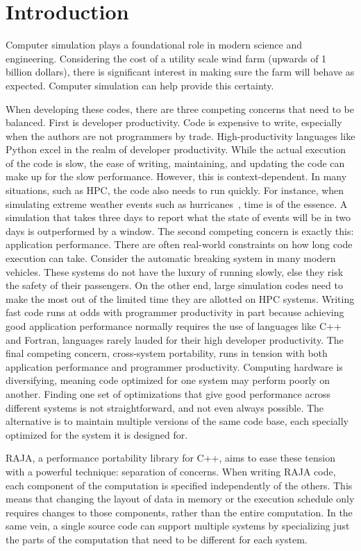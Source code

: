 \documentclass{article}
\begin{document}
\section{Introduction}

Computer simulation plays a foundational role in modern science and engineering. 
Considering the cost of a utility scale wind farm (upwards of 1 billion dollars), there is significant interest in making sure the farm will behave as expected.
Computer simulation can help provide this certainty.

When developing these codes, there are three competing concerns that need to be balanced.
First is developer productivity.
Code is expensive to write, especially when the authors are not programmers by trade.
High-productivity languages like Python excel in the realm of developer productivity.
While the actual execution of the code is slow, the ease of writing, maintaining, and updating the code can make up for the slow performance.
However, this is context-dependent. 
In many situations, such as HPC, the code also needs to run quickly.
For instance, when simulating extreme weather events such as hurricanes~\cite{fu2017redesigning}, time is of the essence. 
A simulation that takes three days to report what the state of events will be in two days is outperformed by a window.
The second competing concern is exactly this: application performance.
There are often real-world constraints on how long code execution can take.
Consider the automatic breaking system in many modern vehicles.
These systems do not have the luxury of running slowly, else they risk the safety of their passengers.
On the other end, large simulation codes need to make the most out of the limited time they are allotted on HPC systems.
Writing fast code runs at odds with programmer productivity in part because achieving good application performance normally requires the use of languages like C++ and Fortran, languages rarely lauded for their high developer productivity.
The final competing concern, cross-system portability, runs in tension with both application performance and programmer productivity.
Computing hardware is diversifying, meaning code optimized for one system may perform poorly on another.
Finding one set of optimizations that give good performance across different systems is not straightforward, and not even always possible.
The alternative is to maintain multiple versions of the same code base, each specially optimized for the system it is designed for.

RAJA, a performance portability library for C++, aims to ease these tension with a powerful technique: separation of concerns.
When writing RAJA code, each component of the computation is specified independently of the others.
This means that changing the layout of data in memory or the execution schedule only requires changes to those components, rather than the entire computation.
In the same vein, a single source code can support multiple systems by specializing just the parts of the computation that need to be different for each system.
\end{document}
